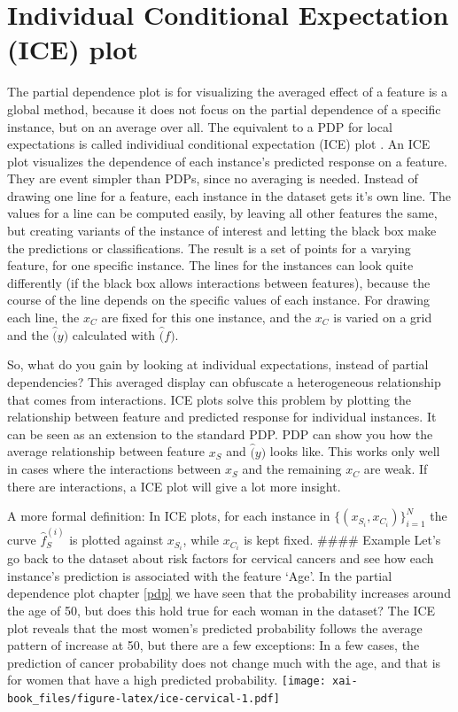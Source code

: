 \documentclass[12pt,]{krantz}
\theoremstyle{definition}
\theoremstyle{definition}
\theoremstyle{definition}
\theoremstyle{remark}
\begin{document}
\section{Individual Conditional Expectation (ICE)
plot}\label{individual-conditional-expectation-ice-plot}

The partial dependence plot is for visualizing the averaged effect of a
feature is a global method, because it does not focus on the partial
dependence of a specific instance, but on an average over all. The
equivalent to a PDP for local expectations is called individiual
conditional expectation (ICE) plot \citep{goldstein2015peeking}. An ICE
plot visualizes the dependence of each instance's predicted response on
a feature. They are event simpler than PDPs, since no averaging is
needed. Instead of drawing one line for a feature, each instance in the
dataset gets it's own line. The values for a line can be computed
easily, by leaving all other features the same, but creating variants of
the instance of interest and letting the black box make the predictions
or classifications. The result is a set of points for a varying feature,
for one specific instance. The lines for the instances can look quite
differently (if the black box allows interactions between features),
because the course of the line depends on the specific values of each
instance. For drawing each line, the \(x_C\) are fixed for this one
instance, and the \(x_C\) is varied on a grid and the \(\hat(y)\)
calculated with \(\hat(f)\).

So, what do you gain by looking at individual expectations, instead of
partial dependencies? This averaged display can obfuscate a
heterogeneous relationship that comes from interactions. ICE plots
\citet{goldstein2015peeking} solve this problem by plotting the
relationship between feature and predicted response for individual
instances. It can be seen as an extension to the standard PDP. PDP can
show you how the average relationship between feature \(x_S\) and
\(\hat(y)\) looks like. This works only well in cases where the
interactions between \(x_S\) and the remaining \(x_C\) are weak. If
there are interactions, a ICE plot will give a lot more insight.

A more formal definition: In ICE plots, for each instance in
\(\{(x_{S_i}, x_{C_i})\}_{i=1}^N\) the curve \(\hat{f}_S^{(i)}\) is
plotted against \(x_{S_i}\), while \(x_{C_i}\) is kept fixed. \#\#\#\#
Example Let's go back to the dataset about risk factors for cervical
cancers and see how each instance's prediction is associated with the
feature `Age'. In the partial dependence plot chapter \ref{pdp} we have
seen that the probability increases around the age of 50, but does this
hold true for each woman in the dataset? The ICE plot reveals that the
most women's predicted probability follows the average pattern of
increase at 50, but there are a few exceptions: In a few cases, the
prediction of cancer probability does not change much with the age, and
that is for women that have a high predicted probability.
\texttt{[image: xai-book\_files/figure-latex/ice-cervical-1.pdf]}
\end{document}
